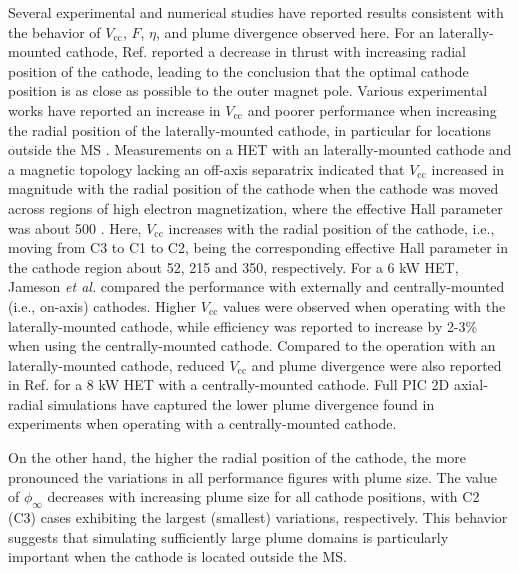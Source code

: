 \documentclass[%
 aip,
cha,
 amsmath,amssymb,
 reprint,%
]{revtex4-1}
\begin{document}
Several experimental and numerical studies have reported results consistent with the behavior of $V_\mathrm{cc}$, $F$, $\eta$, and plume divergence observed here. 
%
For an laterally-mounted cathode, Ref.  reported a decrease in thrust with increasing radial position of the cathode, leading to the conclusion that the optimal cathode position is as close as possible to the outer magnet pole.
%
Various experimental works have reported an increase in $V_\mathrm{cc}$ and poorer performance when increasing the radial position of the laterally-mounted cathode, in particular for locations outside the MS \cite{somm11b,tura16,yu17,ding18}.
%
Measurements on a HET with an laterally-mounted cathode and a magnetic topology lacking an off-axis separatrix indicated that $V_\mathrm{cc}$ increased in magnitude with the radial position of the cathode when the cathode was moved across regions of high electron magnetization, where the effective Hall parameter was about 500 \cite{frie16a}. Here, $V_\mathrm{cc}$ increases with the radial position of the cathode, i.e., moving from C3 to C1 to C2, being the corresponding effective Hall parameter in the cathode region about 52, 215 and 350, respectively.
%
For a 6 kW HET, Jameson \textit{et al.} \cite{jame07} compared the performance with externally and centrally-mounted (i.e., on-axis) cathodes. Higher $V_\mathrm{cc}$ values were observed when operating with the laterally-mounted cathode, while efficiency was reported to increase by 2-3\% when using the centrally-mounted cathode.
%
Compared to the operation with an laterally-mounted cathode, reduced $V_\mathrm{cc}$ and plume divergence were also reported in Ref.  for a 8 kW HET with a centrally-mounted cathode. Full PIC 2D axial-radial simulations \cite{cho17,cao20} have captured the lower plume divergence found in experiments when operating with a centrally-mounted cathode. 


On the other hand, the higher the radial position of the cathode, the more pronounced the variations in all performance figures with plume size. The value of $\phi_\infty$ decreases with increasing plume size for all cathode positions, with C2 (C3) cases exhibiting the largest (smallest) variations, respectively. This behavior suggests that simulating sufficiently large plume domains is particularly important when the cathode is located outside the MS.
\end{document}
